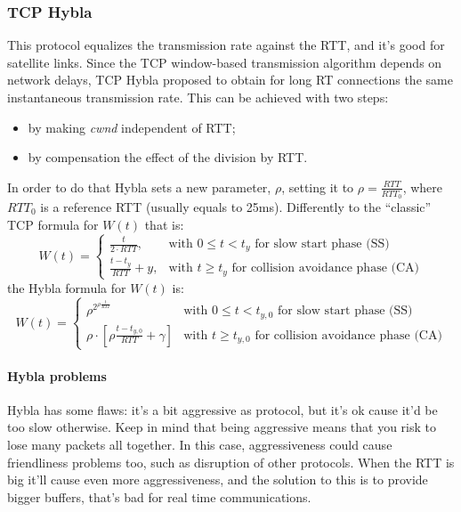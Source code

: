 \subsubsection{TCP Hybla}
\label{prt:tcp:hybla}

This protocol equalizes the transmission rate against the RTT, and it's good for
satellite links. Since the TCP window-based transmission algorithm depends on network delays,
TCP Hybla proposed to obtain for long RT connections the same instantaneous transmission rate. 
This can be achieved with two steps:
\begin{itemize}
	\item by making \emph{cwnd} independent of RTT;
	\item by compensation the effect of the division by RTT.
\end{itemize}

In order to do that Hybla sets a new parameter, $\rho$,
setting it to $\rho = \frac{RTT}{RTT_0}$, where $RTT_0$ is a reference RTT
(usually equals to 25ms).
Differently to the ``classic'' TCP formula for $W(t)$ that is:
\begin{equation*}
  W(t) = \begin{cases}
    \frac{t}{2 \cdot RTT}, & \mbox{with } 0 \le t < t_y \mbox{ for slow start phase (SS)} \\
    \frac{t - t_y}{RTT} + y, & \mbox{with } t \ge t_y \mbox{ for collision avoidance phase (CA)}
  \end{cases}
\end{equation*}
the Hybla formula for $W(t)$ is:
\begin{equation}
  W(t) = \begin{cases}
    \rho^{2^{\rho \frac{t}{RTT}}} & \mbox{with } 0 \le t < t_{y,0} \mbox{ for slow start phase (SS)} \\
    \rho \cdot \left [\rho\frac{t - t_{y,0}}{RTT} + \gamma \right ] & \mbox{with } t \ge t_{y,0} \mbox{ for collision avoidance phase (CA)}
  \end{cases}
\end{equation}

\paragraph*{Hybla problems} Hybla has some flaws: it's a bit aggressive as
protocol, but it's ok cause it'd be too slow otherwise. Keep in mind that being
aggressive means that you risk to lose many packets all together. In this case,
aggressiveness could cause friendliness problems too, such as disruption of
other protocols.
When the RTT is big it'll cause even more aggressiveness, and the solution to
this is to provide bigger buffers, that's bad for real time communications.

